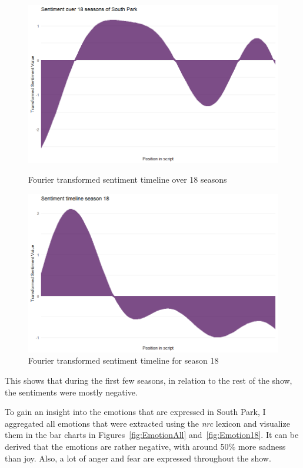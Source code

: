 \documentclass[10pt,a4paper]{article}
\begin{document}
	
	
	\begin{figure}[!h]
  \centering
  \begin{minipage}[b]{0.45\textwidth}
    \includegraphics[width=\textwidth]{images/sentimentAll.png}
    \caption{Fourier transformed sentiment timeline over 18 seasons}
	\label{fig:sentimentFourierAll}
  \end{minipage}
  \hfill
  \begin{minipage}[b]{0.45\textwidth}
    \includegraphics[width=\textwidth]{images/sentiment18.png}
    \caption{Fourier transformed sentiment timeline for season 18}
	\label{fig:sentimentFourier18}
  \end{minipage}
\end{figure}		

	This shows that during the first few seasons, in relation to the rest of the show, the sentiments were mostly negative.
	
	To gain an insight into the emotions that are expressed in South Park, I aggregated all emotions that were extracted using the \textit{nrc} lexicon and visualize them in the bar charts in Figures~\ref{fig:EmotionAll} and~\ref{fig:Emotion18}. It can be derived that  the emotions are rather negative, with around 50\% more sadness than joy. Also, a lot of anger and fear are expressed throughout the show.
	
\end{document}

